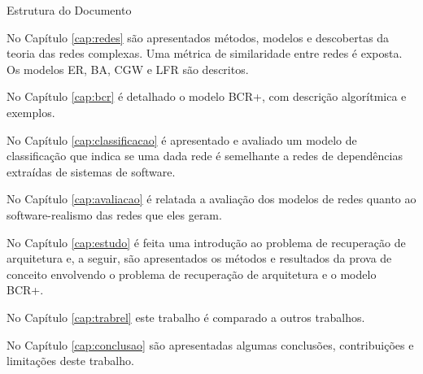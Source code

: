 \begin{section}{Estrutura do Documento}
	
	No Capítulo \ref{cap:redes} são apresentados métodos, modelos e descobertas da teoria das redes complexas. Uma métrica de similaridade entre redes é exposta. Os modelos ER, BA, CGW e LFR são descritos.
	
	No Capítulo \ref{cap:bcr} é detalhado o modelo BCR+, com descrição algorítmica e exemplos.
	
	No Capítulo \ref{cap:classificacao} é apresentado e avaliado um modelo de classificação que indica se uma dada rede é semelhante a redes de dependências extraídas de sistemas de software.
	
	No Capítulo \ref{cap:avaliacao} é relatada a avaliação dos modelos de redes quanto ao software-realismo das redes que eles geram.
	
	No Capítulo \ref{cap:estudo} é feita uma introdução ao problema de recuperação de arquitetura e, a seguir, são apresentados os métodos e resultados da prova de conceito envolvendo o problema de recuperação de arquitetura e o modelo BCR+.
	
	No Capítulo \ref{cap:trabrel} este trabalho é comparado a outros trabalhos.
	
	No Capítulo \ref{cap:conclusao} são apresentadas algumas conclusões, contribuições e limitações deste trabalho.
	
\end{section}
